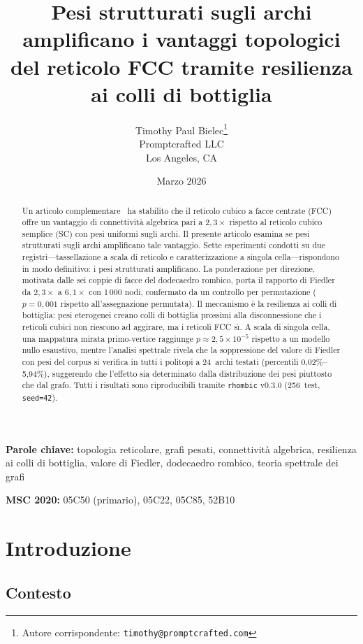 \documentclass[11pt]{article}
\title{%
  Pesi strutturati sugli archi amplificano i vantaggi topologici\\
  del reticolo FCC tramite resilienza ai colli di bottiglia%
}
\author{%
  Timothy Paul Bielec\thanks{Autore corrispondente: \texttt{timothy@promptcrafted.com}}\\
  Promptcrafted LLC\\
  Los Angeles, CA
}
\date{Marzo 2026}
\begin{document}
\maketitle

\begin{abstract}
Un articolo complementare~\cite{bielec2026shape} ha stabilito che il
reticolo cubico a facce centrate (FCC) offre un vantaggio di
connettivit\`a algebrica pari a $2{,}3\times$ rispetto al reticolo
cubico semplice (SC) con pesi uniformi sugli archi. Il presente
articolo esamina se pesi strutturati sugli archi amplificano tale
vantaggio. Sette esperimenti condotti su due registri---tassellazione
a scala di reticolo e caratterizzazione a singola cella---rispondono
in modo definitivo: i pesi strutturati amplificano. La ponderazione
per direzione, motivata dalle sei coppie di facce del dodecaedro
rombico, porta il rapporto di Fiedler da $2{,}3\times$ a $6{,}1\times$
con 1\,000 nodi, confermato da un controllo per permutazione
($p = 0{,}001$ rispetto all'assegnazione permutata). Il meccanismo
\`e la resilienza ai colli di bottiglia: pesi eterogenei creano colli
di bottiglia prossimi alla disconnessione che i reticoli cubici non
riescono ad aggirare, ma i reticoli FCC s\`\i. A scala di singola
cella, una mappatura mirata primo-vertice raggiunge
$p \approx 2{,}5 \times 10^{-5}$ rispetto a un modello nullo esaustivo,
mentre l'analisi spettrale rivela che la soppressione del valore di
Fiedler con pesi del corpus si verifica in tutti i politopi a 24~archi
testati (percentili 0,02\%--5,94\%), suggerendo che l'effetto sia
determinato dalla distribuzione dei pesi piuttosto che dal grafo. Tutti
i risultati sono riproducibili tramite \texttt{rhombic} v0.3.0
(256~test, \texttt{seed=42}).
\end{abstract}

\noindent\textbf{Parole chiave:} topologia reticolare, grafi pesati,
connettivit\`a algebrica, resilienza ai colli di bottiglia, valore di
Fiedler, dodecaedro rombico, teoria spettrale dei grafi

\smallskip\noindent\textbf{MSC 2020:} 05C50 (primario), 05C22, 05C85, 52B10

\section{Introduzione}
\label{sec:intro}

\subsection{Contesto}
\end{document}

